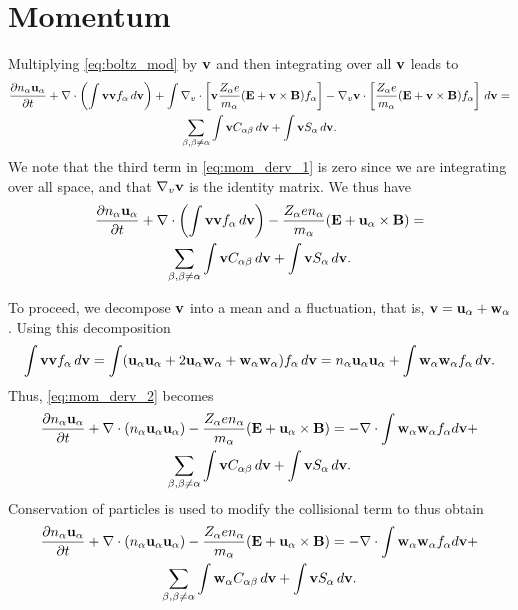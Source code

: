 \documentclass[a4paper,11pt]{report}
\begin{document}
\section{Momentum}
Multiplying \cref{eq:boltz_mod} by $\mathbf{v}$ and then integrating over all $\mathbf{v}$ leads to
\begin{multline}
\label{eq:mom_derv_1}
\frac{\partial n_\alpha \mathbf{u}_\alpha}{\partial t} + \nabla \cdot \left ( \int \mathbf{v} \mathbf{v} f_\alpha \, d\mathbf{v} \right) + \int \nabla_v \cdot \left [ \mathbf{v} \frac{Z_\alpha e}{m_\alpha} ( \mathbf{E} + \mathbf{v} \times \mathbf{B} ) f_\alpha \right ] - \nabla_v \mathbf{v} \cdot \left [ \frac{Z_\alpha e}{m_\alpha} ( \mathbf{E} + \mathbf{v} \times \mathbf{B} ) f_\alpha \right ] \, d\mathbf{v} =\\
\sum_{\beta, \beta \ne \alpha} \int \mathbf{v} C_{\alpha \beta} \, d\mathbf{v} + \int \mathbf{v} S_\alpha \, d\mathbf{v}.
\end{multline}
We note that the third term in \cref{eq:mom_derv_1} is zero since we are integrating over all space, and that $\nabla_v \mathbf{v}$ is the identity matrix. We thus have
\begin{multline}
\label{eq:mom_derv_2}
\frac{\partial n_\alpha \mathbf{u}_\alpha}{\partial t} + \nabla \cdot \left ( \int \mathbf{v} \mathbf{v} f_\alpha \, d\mathbf{v} \right) - \frac{Z_\alpha e n_\alpha}{m_\alpha} ( \mathbf{E} + \mathbf{u}_\alpha \times \mathbf{B} ) =\\
\sum_{\beta, \beta \ne \alpha} \int \mathbf{v} C_{\alpha \beta} \, d\mathbf{v} + \int \mathbf{v} S_\alpha \, d\mathbf{v}.
\end{multline}

To proceed, we decompose $\mathbf{v}$ into a mean and a fluctuation, that is, $\mathbf{v} = \mathbf{u}_\alpha + \mathbf{w}_\alpha$. Using this decomposition 
\begin{equation}
\label{eq:identity_vv}
\int \mathbf{v} \mathbf{v} f_\alpha \, d\mathbf{v} = \int ( \mathbf{u}_\alpha \mathbf{u}_\alpha + 2 \mathbf{u}_\alpha \mathbf{w}_\alpha + \mathbf{w}_\alpha \mathbf{w}_\alpha) f_\alpha \, d\mathbf{v} = n_\alpha \mathbf{u}_\alpha \mathbf{u}_\alpha + \int \mathbf{w}_\alpha \mathbf{w}_\alpha f_\alpha \, d\mathbf{v}.
\end{equation}
Thus, \cref{eq:mom_derv_2} becomes
\begin{multline}
\label{eq:mom_derv_3}
\frac{\partial n_\alpha \mathbf{u}_\alpha}{\partial t} + \nabla \cdot \left ( n_\alpha \mathbf{u}_\alpha \mathbf{u}_\alpha \right) - \frac{Z_\alpha e n_\alpha}{m_\alpha} ( \mathbf{E} + \mathbf{u}_\alpha \times \mathbf{B} ) = -\nabla \cdot \int \mathbf{w}_\alpha \mathbf{w}_\alpha f_\alpha d\mathbf{v} + \\
\sum_{\beta, \beta \ne \alpha} \int \mathbf{v} C_{\alpha \beta} \, d\mathbf{v} + \int \mathbf{v} S_\alpha \, d\mathbf{v}.
\end{multline}
Conservation of particles is used to modify the collisional term to thus obtain
\begin{multline}
\label{eq:mom_derv_4}
\frac{\partial n_\alpha \mathbf{u}_\alpha}{\partial t} + \nabla \cdot \left ( n_\alpha \mathbf{u}_\alpha \mathbf{u}_\alpha \right) - \frac{Z_\alpha e n_\alpha}{m_\alpha} ( \mathbf{E} + \mathbf{u}_\alpha \times \mathbf{B} ) = -\nabla \cdot \int \mathbf{w}_\alpha \mathbf{w}_\alpha f_\alpha d\mathbf{v} + \\
\sum_{\beta, \beta \ne \alpha} \int \mathbf{w}_\alpha C_{\alpha \beta} \, d\mathbf{v} + \int \mathbf{v} S_\alpha \, d\mathbf{v}.
\end{multline}
\end{document}
